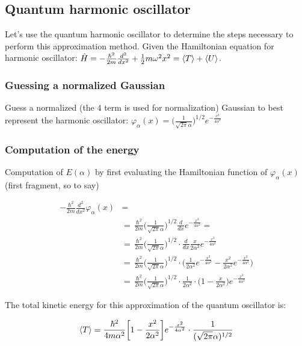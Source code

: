 	\subsection{Quantum harmonic oscillator}
	Let's use the quantum harmonic oscillator to determine the steps necessary to perform this approximation method.
	Given the Hamiltonian equation for harmonic oscillator: $\hat{H}=-\frac{\hbar^2}{2m}\frac{d^2}{dx^2}+\frac{1}{2}m\omega^2x^2=\expval{T}+\expval{U}$.

		\subsubsection{Guessing a normalized Gaussian}
		Guess a normalized (the $4$ term is used for normalization) Gaussian to best represent the harmonic oscillator: $\varphi_{\alpha}(x)=\bigg(\frac{1}{\sqrt{2\pi}\alpha}\bigg)^{1/2}e^{-{\frac{x^2}{4\alpha^2}}}$

		\subsubsection{Computation of the energy}
		Computation of $E(\alpha)$ by first evaluating the Hamiltonian function of $\varphi_{\alpha}(x)$ (first fragment, so to say)

		\begin{align*}
			-\frac{\hbar^2}{2m}\frac{d^2}{dx^2}\varphi_{\alpha}(x)&=\\
			&=\,\frac{\hbar^2}{2m}\bigg(\frac{1}{\sqrt{2\pi}\alpha}\bigg)^{1/2}\frac{d}{dx}e^{-{\frac{x^2}{4\alpha^2}}}=\\
			&=\,\frac{\hbar^2}{2m}\bigg(\frac{1}{\sqrt{2\pi}\alpha}\bigg)^{1/2}\cdot\frac{d}{dx}\frac{x}{2\alpha^2}e^{-{\frac{x^2}{4\alpha^2}}}\\
			&=\,\frac{\hbar^2}{2m}\bigg(\frac{1}{\sqrt{2\pi}\alpha}\bigg)^{1/2}\cdot\bigg(\frac{1}{2\alpha^2}e^{-{\frac{x^2}{4\alpha^2}}}-\frac{x^2}{2\alpha^2}e^{-\frac{x^2}{4\alpha^2}}\bigg)\\
			&=\,\frac{\hbar^2}{2m}\bigg(\frac{1}{\sqrt{2\pi}\alpha}\bigg)^{1/2}\cdot\frac{1}{2\alpha^2}\cdot\bigg(1-\frac{x}{2\alpha^2}\bigg)e^{-{\frac{x^2}{4\alpha^2}}}
		\end{align*}

		The total kinetic energy for this approximation of the quantum oscillator is:

		$$\expval{T}=\frac{\hbar^2}{4m\alpha^2}\bigg[1-\frac{x^2}{2\alpha^2}\bigg]e^{-{\frac{x^2}{4\alpha^2}}}\cdot\frac{1}{(\sqrt{2\pi}\alpha)^{1/2}}$$

